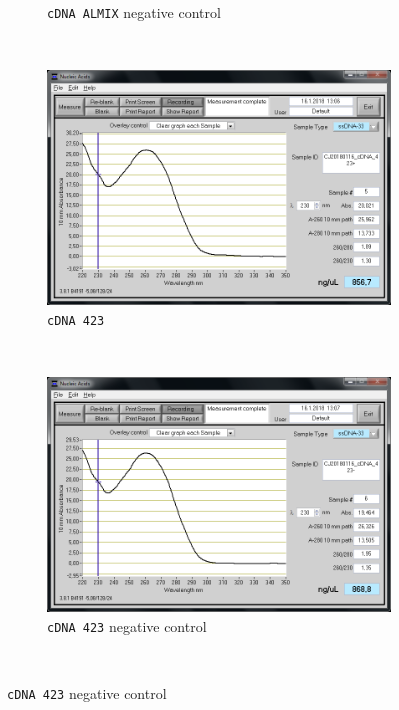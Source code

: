 \begin{figure}[H]
\begin{subfigure}[b]{0.49\textwidth}
        \caption{\texttt{cDNA ALMIX} negative control}
        \label{sfig:CJ20180116_cDNA_ALMIX+}
    \end{subfigure}
    \\
        \begin{subfigure}[b]{0.49\textwidth}
        \includegraphics[width=\textwidth]{graphics/screenshots/CJ20180116_cDNA_423+.png}
        \caption{\texttt{cDNA 423}}
        \label{sfig:CJ20180116_cDNA_423+}
    \end{subfigure}
    ~ 
    \begin{subfigure}[b]{0.49\textwidth}
        \includegraphics[width=\textwidth]{graphics/screenshots/CJ20180116_cDNA_423-.png}
        \caption{\texttt{cDNA 423} negative control}
        \label{sfig:CJ20180116_cDNA_423-}
    \end{subfigure}
    \\

\end{figure}
